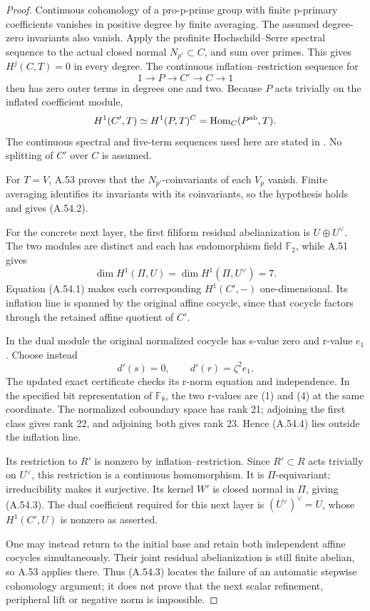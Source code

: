 \begin{proof}
Continuous cohomology of a pro-p-prime group
with finite p-primary coefficients vanishes in
positive degree by finite averaging. The
assumed degree-zero invariants also vanish.
Apply the profinite Hochschild--Serre spectral
sequence to the actual closed normal
\(N_{p'}\subset C\), and sum over primes.
This gives \(H^j(C,T)=0\) in every degree.
The continuous inflation--restriction sequence
for
\[
                 1\longrightarrow P\longrightarrow C'
                     \longrightarrow C\longrightarrow1
\]
then has zero outer terms in degrees one and
two. Because \(P\) acts trivially on the
inflated coefficient module,
\[
 H^1(C',T)\simeq H^1(P,T)^C
       =\operatorname{Hom}_C(P^{\rm ab},T).
\]
The continuous spectral and five-term sequences
used here are stated in
\citet[Theorem~6.7.3 and Corollary~6.7.4, p.~194]{APoonen2017}.
No splitting of \(C'\) over \(C\) is assumed.

For \(T=V\), A.53 proves that the
\(N_{p'}\)-coinvariants of each \(V_p\)
vanish. Finite averaging identifies its
invariants with its coinvariants, so the
hypothesis holds and gives (A.54.2).

For the concrete next layer, the first
filiform residual abelianization is
\(U\oplus U^\vee\). The two modules are
distinct and each has endomorphism field
\(\mathbb F_2\), while A.51 gives
\[
 \dim H^1(\Pi,U)=\dim H^1(\Pi,U^\vee)=7.
\]
Equation (A.54.1) makes each corresponding
\(H^1(C',-)\) one-dimensional. Its inflation
line is spanned by the original affine
cocycle, since that cocycle factors through
the retained affine quotient of \(C'\).

In the dual module the original normalized
cocycle has s-value zero and r-value \(e_1\).
Choose instead
\[
                         d'(s)=0,
                         \qquad d'(r)=\zeta^2 e_1.
                                                               \tag{A.54.4}
\]
The updated exact certificate
 checks its
r-norm equation and independence. In the
specified bit representation of \(\mathbb F_8\),
the two r-values are (1) and (4) at the
same coordinate. The normalized coboundary
space has rank 21; adjoining the first class
gives rank 22, and adjoining both gives
rank 23. Hence (A.54.4) lies outside the
inflation line.

Its restriction to \(R'\) is nonzero by
inflation--restriction. Since \(R'\subset R\)
acts trivially on \(U^\vee\), this restriction
is a continuous homomorphism. It is
\(\Pi\)-equivariant; irreducibility makes it
surjective. Its kernel \(W'\) is closed
normal in \(\Pi\), giving (A.54.3).
The dual coefficient required for this next
layer is \((U^\vee)^\vee=U\), whose
\(H^1(C',U)\) is nonzero as asserted.

One may instead return to the initial base
and retain both independent affine cocycles
simultaneously. Their joint residual
abelianization is still finite abelian, so
A.53 applies there. Thus (A.54.3) locates
the failure of an automatic stepwise
cohomology argument; it does not prove that
the next scalar refinement, peripheral lift
or negative norm is impossible.
\end{proof}


